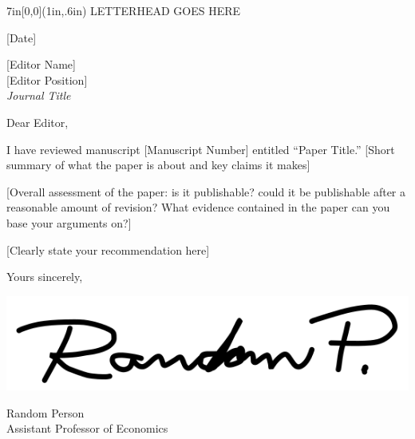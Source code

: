\documentclass[12pt]{article}
\begin{document}
\begin{textblock*}{7in}[0,0](1in,.6in)
    \vspace{-.5in}
    \centering
    \huge{LETTERHEAD GOES HERE}
\end{textblock*}

\vspace{1.8in}

\begin{flushright}
{[}Date{]}
\end{flushright}

{[}Editor Name{]}\\
{[}Editor Position{]}\\
\emph{Journal Title}


\vspace{.2in}

Dear Editor,

I have reviewed manuscript {[}Manuscript Number{]} entitled ``Paper Title.'' {[}Short summary of what the paper is about and key claims it makes{]}

{[}Overall assessment of the paper: is it publishable? could it be publishable after a reasonable amount of revision? What evidence contained in the paper can you base your arguments on?{]}

{[}Clearly state your recommendation here{]}


\bigskip

Yours sincerely, \par

\hspace{-10pt}\vspace{-10pt}\includegraphics[height=2.0\baselineskip]{random-person.png} \par
\vspace{-10pt}
\bigskip
\medskip
Random Person \\
Assistant Professor of Economics
\end{document}
